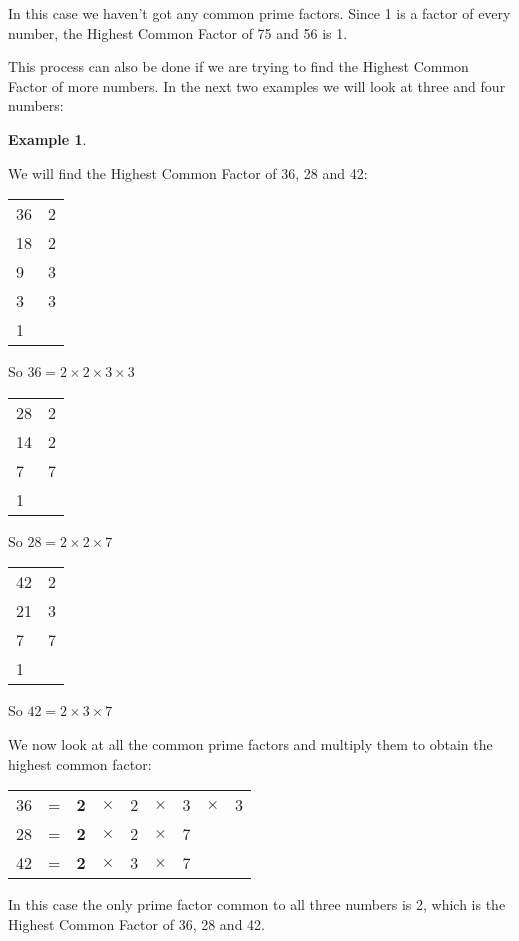 \documentclass[11pt, oneside]{article}
\theoremstyle{definition}
\newtheorem{exmp}{Example}[section]
\begin{document}
In this case we haven't got any common prime factors. Since 1 is a factor of every number, the Highest Common Factor of 75 and 56 is 1.

\bigbreak

This process can also be done if we are trying to find the Highest Common Factor of more numbers. In the next two examples we will look at three and four numbers:

\begin{exmp} \end{exmp}
We will find the Highest Common Factor of 36, 28 and 42:

\begin{tabular}{ p{0.5cm} | p{1.5cm}}
36 & 2  \\
18 & 2  \\
9 & 3  \\
3 & 3  \\
1 &  
\end{tabular}

So $36 = 2 \times 2 \times 3 \times 3$

\bigbreak

\begin{tabular}{ p{0.5cm} | p{1.5cm}}
28 & 2  \\
14 & 2  \\
7 & 7  \\
1 
\end{tabular}

So $28 = 2 \times 2 \times 7$

\bigbreak

\begin{tabular}{ p{0.5cm} | p{1.5cm}}
42 & 2  \\
21 & 3  \\
7 & 7  \\
1 
\end{tabular}

So $42 = 2 \times 3 \times 7$

We now look at all the common prime factors and multiply them to obtain the highest common factor:

\begin{tabular}{c c c c c c c c c}
36 & = & {\bf2} & $\times $ & 2 & $\times$  & 3 & $\times$ & 3  \\
28 & = & {\bf2} & $\times $ & 2 & $\times$  & 7 &  & \\
42 & = & {\bf2} & $\times $ & 3 & $\times$  & 7 &  &
\end{tabular}

In this case the only prime factor common to all three numbers is 2, which is the Highest Common Factor of 36, 28 and 42.
\end{document}

